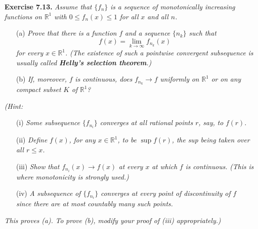 \documentclass{article}
\begin{document}



\textbf{Exercise 7.13.}
\emph{Assume that $\{f_n\}$ is a sequence of monotonically increasing functions on $\mathbb{R}^1$
with $0 \leq  f_n(x) \leq 1$ for all $x$ and all $n$.}
\begin{enumerate}
\item[(a)]
  \emph{Prove that there is a function $f$ and a sequence $\{n_k\}$ such that
  \[
    f(x) = \lim_{k \to \infty} f_{n_k}(x)
  \]
  for every $x \in \mathbb{R}^1$.
  (The existence of such a pointwise convergent subsequence is usually
  called \textbf{Helly's selection theorem}.)}

\item[(b)]
  \emph{If, moreover, $f$ is continuous, does $f_{n_k} \to f$ uniformly on $\mathbb{R}^1$
  or on any compact subset $K$ of $\mathbb{R}^1$?}
\end{enumerate}

\emph{(Hint:}
\begin{enumerate}
\item[(i)]
\emph{Some subsequence $\{f_{n_i}\}$ converges at all rational points $r$, say, to $f(r)$.}

\item[(ii)]
\emph{Define $f(x)$, for any $x \in \mathbb{R}^1$, to be $\sup f(r)$,
the sup being taken over all $r \leq x$.}

\item[(iii)]
\emph{Show that $f_{n_i}(x) \to f(x)$ at every $x$ at which $f$ is continuous.
(This is where monotonicity is strongly used.)}

\item[(iv)]
\emph{A subsequence of $\{f_{n_i}\}$ converges at every point of discontinuity of $f$
since there are at most countably many such points.}

\end{enumerate}
\emph{This proves (a).
To prove (b), modify your proof of (iii) appropriately.)} \\
\end{document}
